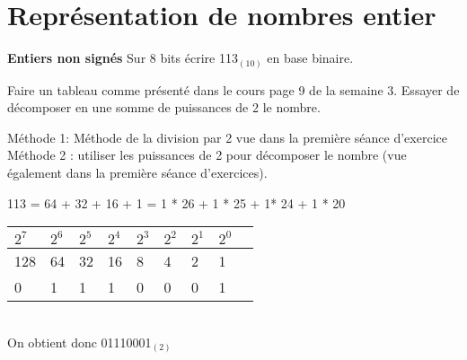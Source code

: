 \section{Représentation de nombres entier}

\begin{Exercice}[15 minutes] \textbf{Entiers non signés}
	Sur 8 bits écrire 113$_{(10)}$ en base binaire.
   
    \begin{conseil}
		Faire un tableau comme présenté dans le cours page 9 de la semaine 3. Essayer de décomposer en une somme de puissances de 2 le nombre.
    \end{conseil}
    
    \begin{solution}
        Méthode 1: Méthode de la division par 2 vue dans la première séance d'exercice\\
        
        Méthode 2 : utiliser les puissances de 2 pour décomposer le nombre (vue également dans la première séance d'exercices).
        
        113 = 64 + 32 + 16 + 1 = 1 * 26 + 1 * 25 + 1* 24 + 1 * 20 \\
        
        \begin{tabular}{| p{1cm} | p{1cm} | p{1cm} | p{1cm} | p{1cm} | p{1cm} | p{1cm} | p{1cm} | p{1cm} |} 
            \hline
	      	$2^7$ & $2^6$ & $2^5$ & $2^4$ & $2^3$ & $2^2$ & $2^1$ & $2^0$ \\ [0.5ex]
	    	\hline
            128 & 64 & 32 & 16 & 8 & 4 & 2 & 1 \\ [0.5ex] 
            \hline
            0 & 1 & 1 & 1 & 0 & 0 & 0 & 1 \\ [0.5ex] 
            \hline
        \end{tabular} \\
        
        On obtient donc 01110001$_{(2)}$ \\
    \end{solution}
\end{Exercice}

